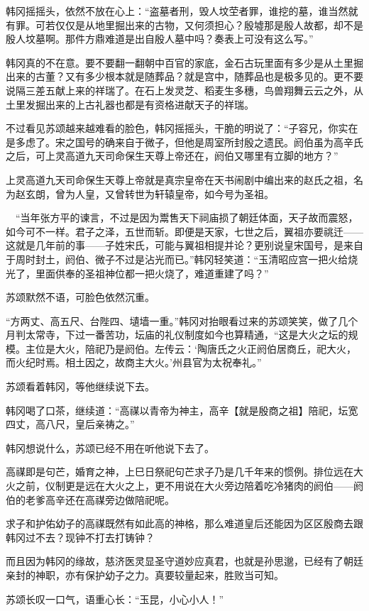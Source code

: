 韩冈摇摇头，依然不放在心上：“盗墓者刑，毁人坟茔者罪，谁挖的墓，谁当然就有罪。可若仅仅是从地里掘出来的古物，又何须担心？殷墟那是殷人故都，却不是殷人坟墓啊。那件方鼎难道是出自殷人墓中吗？奏表上可没有这么写。”

韩冈真的不在意。要不要翻一翻朝中百官的家底，金石古玩里面有多少是从土里掘出来的古董？又有多少根本就是随葬品？就是宫中，随葬品也是极多见的。更不要说隔三差五献上来的祥瑞了。在石上发灵芝、稻麦生多穗，鸟兽翔舞云云之外，从土里发掘出来的上古礼器也都是有资格进献天子的祥瑞。

不过看见苏颂越来越难看的脸色，韩冈摇摇头，干脆的明说了：“子容兄，你实在是多虑了。宋之国号的确来自于微子，但他是周室所封殷之遗民。阏伯虽为高辛氏之后，可上灵高道九天司命保生天尊上帝还在，阏伯又哪里有立脚的地方？”

上灵高道九天司命保生天尊上帝就是真宗皇帝在天书闹剧中编出来的赵氏之祖，名为赵玄朗，曾为人皇，又曾转世为轩辕皇帝，如今号为圣祖。

　“当年张方平的谏言，不过是因为鬻售天下祠庙损了朝廷体面，天子故而震怒，如今可不一样。君子之泽，五世而斩。即便是天家，七世之后，翼祖亦要祧迁——这就是几年前的事——子姓宋氏，可能与翼祖相提并论？更别说皇宋国号，是来自于周时封土，阏伯、微子不过是沾光而已。”韩冈轻笑道：“玉清昭应宫一把火给烧光了，里面供奉的圣祖神位都一把火烧了，难道重建了吗？”

苏颂默然不语，可脸色依然沉重。

“方两丈、高五尺、台陛四、壝墙一重。”韩冈对抬眼看过来的苏颂笑笑，做了几个月判太常寺，下过一番苦功，坛庙的礼仪制度如今也算精通，“这是大火之坛的规模。主位是大火，陪祀乃是阏伯。左传云：‘陶唐氏之火正阏伯居商丘，祀大火，而火纪时焉。相土因之，故商主大火。’州县官为太祝奉礼。”

苏颂看着韩冈，等他继续说下去。

韩冈喝了口茶，继续道：“高禖以青帝为神主，高辛【就是殷商之祖】陪祀，坛宽四丈，高八尺，皇后亲祷之。”

韩冈想说什么，苏颂已经不用在听他说下去了。

高禖即是句芒，婚育之神，上巳日祭祀句芒求子乃是几千年来的惯例。排位远在大火之前，仪制更是远在大火之上，更不用说在大火旁边陪着吃冷猪肉的阏伯——阏伯的老爹高辛还在高禖旁边做陪祀呢。

求子和护佑幼子的高禖既然有如此高的神格，那么难道皇后还能因为区区殷商去跟韩冈过不去？现钟不打去打铸钟？

而且因为韩冈的缘故，慈济医灵显圣守道妙应真君，也就是孙思邈，已经有了朝廷亲封的神职，亦有保护幼子之力。真要较量起来，胜败当可知。

苏颂长叹一口气，语重心长：“玉昆，小心小人！”

